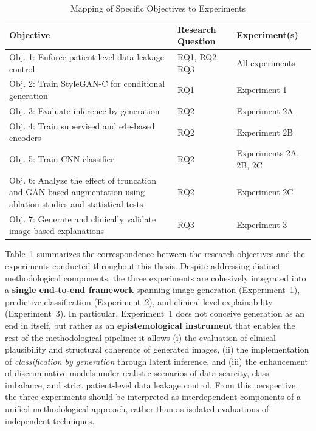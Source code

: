 \begin{table}[ht]
\centering
\caption{Mapping of Specific Objectives to Experiments}
\begin{tabular}{|p{6.5cm}|p{2.5cm}|p{3cm}|}
\hline
\textbf{Objective} & \textbf{Research Question} & \textbf{Experiment(s)} \\
\hline
Obj. 1: Enforce patient-level data leakage control & RQ1, RQ2, RQ3 & All experiments \\
\hline
Obj. 2: Train StyleGAN-C for conditional generation & RQ1 & Experiment 1 \\
\hline
Obj. 3: Evaluate inference-by-generation & RQ2 & Experiment 2A \\
\hline
Obj. 4: Train supervised and e4e-based encoders & RQ2 & Experiment 2B \\
\hline
Obj. 5: Train CNN classifier & RQ2 & Experiments 2A, 2B, 2C \\
\hline
Obj. 6: Analyze the effect of truncation and GAN-based augmentation using ablation studies and statistical tests & RQ2 & Experiment 2C \\
\hline
Obj. 7: Generate and clinically validate image-based explanations & RQ3 & Experiment 3 \\
\hline
\end{tabular}
\label{tab:objectives_mapping}
\end{table}

Table~\ref{tab:objectives_mapping} summarizes the correspondence between the research objectives and the experiments conducted throughout this thesis. Despite addressing distinct methodological components, the three experiments are cohesively integrated into a \textbf{single end-to-end framework} spanning image generation (Experiment~1), predictive classification (Experiment~2), and clinical-level explainability (Experiment~3). In particular, Experiment~1 does not conceive generation as an end in itself, but rather as an \textbf{epistemological instrument} that enables the rest of the methodological pipeline: it allows (i) the evaluation of clinical plausibility and structural coherence of generated images, (ii) the implementation of \emph{classification by generation} through latent inference, and (iii) the enhancement of discriminative models under realistic scenarios of data scarcity, class imbalance, and strict patient-level data leakage control. From this perspective, the three experiments should be interpreted as interdependent components of a unified methodological approach, rather than as isolated evaluations of independent techniques.


